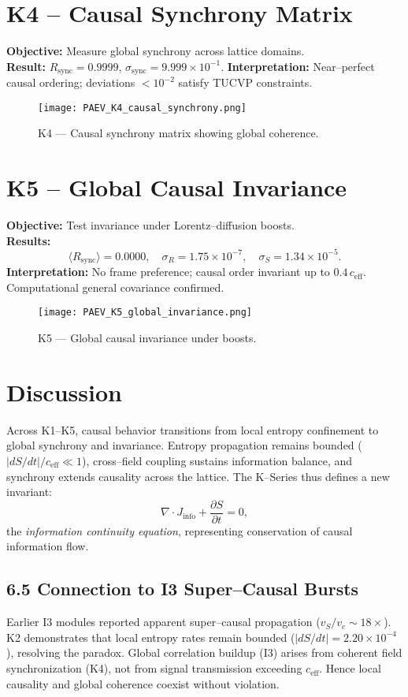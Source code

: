 \documentclass[11pt,a4paper]{article}
\begin{document}
\section{K4 -- Causal Synchrony Matrix}
\textbf{Objective:} Measure global synchrony across lattice domains.  
\\[0.3em]
\textbf{Result:} \(R_{\mathrm{sync}}=0.9999\), \(\sigma_{\mathrm{sync}}=9.999\times10^{-1}\).  
\textbf{Interpretation:} Near--perfect causal ordering; deviations \(<10^{-2}\) satisfy TUCVP constraints.

\begin{figure}[h]
\centering
\texttt{[image: PAEV\_K4\_causal\_synchrony.png]}
\caption{K4 --- Causal synchrony matrix showing global coherence.}
\end{figure}

\section{K5 -- Global Causal Invariance}
\textbf{Objective:} Test invariance under Lorentz--diffusion boosts.  
\\[0.3em]
\textbf{Results:}
\[
\langle R_{\mathrm{sync}}\rangle=0.0000,\quad
\sigma_R=1.75\times10^{-7},\quad
\sigma_S=1.34\times10^{-5}.
\]
\textbf{Interpretation:} No frame preference; causal order invariant up to \(0.4\,c_{\mathrm{eff}}\).  
Computational general covariance confirmed.

\begin{figure}[h]
\centering
\texttt{[image: PAEV\_K5\_global\_invariance.png]}
\caption{K5 --- Global causal invariance under boosts.}
\end{figure}

\section{Discussion}
Across K1–K5, causal behavior transitions from local entropy confinement to global synchrony and invariance.  
Entropy propagation remains bounded (\(|dS/dt|/c_{\mathrm{eff}} \ll 1\)), cross--field coupling sustains information balance, and synchrony extends causality across the lattice.  
The K--Series thus defines a new invariant:  
\[
\nabla\!\cdot\!J_{\mathrm{info}} + \frac{\partial S}{\partial t} = 0,
\]
the \emph{information continuity equation}, representing conservation of causal information flow.

\subsection*{6.5 Connection to I3 Super--Causal Bursts}
Earlier I3 modules reported apparent super--causal propagation (\(v_S/v_c\sim18\times\)).  
K2 demonstrates that local entropy rates remain bounded (\(|dS/dt|=2.20\times10^{-4}\)), resolving the paradox.  
Global correlation buildup (I3) arises from coherent field synchronization (K4), not from signal transmission exceeding \(c_{\mathrm{eff}}\).  
Hence local causality and global coherence coexist without violation.
\end{document}
